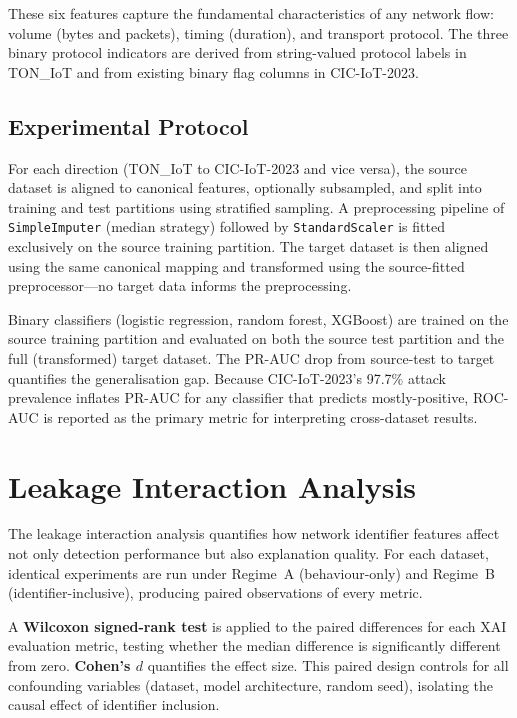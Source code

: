 \documentclass[12pt,a4paper]{report}
\begin{document}
These six features capture the fundamental characteristics of any network flow: volume (bytes and packets), timing (duration), and transport protocol. The three binary protocol indicators are derived from string-valued protocol labels in TON\_IoT and from existing binary flag columns in CIC-IoT-2023.

\subsection{Experimental Protocol}
\label{sec:cross-protocol}

For each direction (TON\_IoT to CIC-IoT-2023 and vice versa), the source dataset is aligned to canonical features, optionally subsampled, and split into training and test partitions using stratified sampling. A preprocessing pipeline of \texttt{SimpleImputer} (median strategy) followed by \texttt{StandardScaler} is fitted exclusively on the source training partition. The target dataset is then aligned using the same canonical mapping and transformed using the source-fitted preprocessor---no target data informs the preprocessing.

Binary classifiers (logistic regression, random forest, XGBoost) are trained on the source training partition and evaluated on both the source test partition and the full (transformed) target dataset. The PR-AUC drop from source-test to target quantifies the generalisation gap. Because CIC-IoT-2023's 97.7\% attack prevalence inflates PR-AUC for any classifier that predicts mostly-positive, ROC-AUC is reported as the primary metric for interpreting cross-dataset results.

\section{Leakage Interaction Analysis}
\label{sec:leakage-interaction}

The leakage interaction analysis quantifies how network identifier features affect not only detection performance but also explanation quality. For each dataset, identical experiments are run under Regime~A (behaviour-only) and Regime~B (identifier-inclusive), producing paired observations of every metric.

A \textbf{Wilcoxon signed-rank test} is applied to the paired differences for each XAI evaluation metric, testing whether the median difference is significantly different from zero. \textbf{Cohen's $d$} quantifies the effect size. This paired design controls for all confounding variables (dataset, model architecture, random seed), isolating the causal effect of identifier inclusion.
\end{document}
